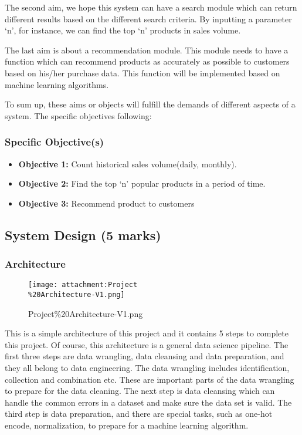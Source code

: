 \documentclass[11pt]{article}
\providecommand{\tightlist}{%
      \setlength{\itemsep}{0pt}\setlength{\parskip}{0pt}}
\begin{document}
The second aim, we hope this system can have a search module which can
return different results based on the different search criteria. By
inputting a parameter `n', for instance, we can find the top `n'
products in sales volume.

The last aim is about a recommendation module. This module needs to have
a function which can recommend products as accurately as possible to
customers based on his/her purchase data. This function will be
implemented based on machine learning algorithms.

To sum up, these aims or objects will fulfill the demands of different
aspects of a system. The specific objectives following:

\hypertarget{specific-objectives}{%
\subsubsection{Specific Objective(s)}\label{specific-objectives}}

\begin{itemize}
\tightlist
\item
  \textbf{Objective 1:} Count historical sales volume(daily, monthly).
\item
  \textbf{Objective 2:} Find the top `n' popular products in a period of
  time.
\item
  \textbf{Objective 3:} Recommend product to customers
\end{itemize}

\hypertarget{system-design-5-marks}{%
\subsection{System Design (5 marks)}\label{system-design-5-marks}}

\hypertarget{architecture}{%
\subsubsection{Architecture}\label{architecture}}

\begin{figure}
\centering
\texttt{[image: attachment:Project\\\%20Architecture-V1.png]}
\caption{Project\%20Architecture-V1.png}
\end{figure}

This is a simple architecture of this project and it contains 5 steps to
complete this project. Of course, this architecture is a general data
science pipeline. The first three steps are data wrangling, data
cleansing and data preparation, and they all belong to data engineering.
The data wrangling includes identification, collection and combination
etc. These are important parts of the data wrangling to prepare for the
data cleaning. The next step is data cleansing which can handle the
common errors in a dataset and make sure the data set is valid. The
third step is data preparation, and there are special tasks, such as
one-hot encode, normalization, to prepare for a machine learning
algorithm.
\end{document}
